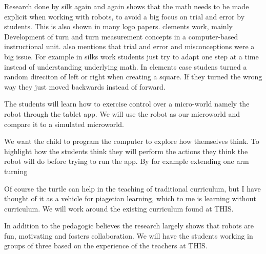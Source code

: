 Research done by silk again and again shows that the math needs to be made explicit when working with robots, to avoid a big focus on trial and error by students. This is also shown in many logo papers. clements work, mainly Development of turn and turn measurement concepts in a computer-based instructional unit. also mentions that trial and error and misconceptions were a big issue. For example in silks work students just try to adapt one step at a time instead of understanding underlying math. In clements case studens turned a random direciton of left or right when creating a square. If they turned the wrong way they just moved backwards instead of forward. 

The students will learn how to exercise control over a micro-world namely the robot through the tablet app. We will use the robot as our microworld and compare it to a simulated microworld.

We want the child to program the computer to explore how themselves think. To highlight how the students think they will perform the actions they think the robot will do before trying to run the app. By for example extending one arm turning 

Of course the turtle can help in the teaching of traditional curriculum, but I have thought of it as a vehicle for piagetian learning, which to me is learning without curriculum. We will work around the existing curriculum found at THIS.

In addition to the pedagogic believes the research largely shows that robots are fun, motivating and fosters collaboration. We will have the students working in groups of three based on the experience of the teachers at THIS.
